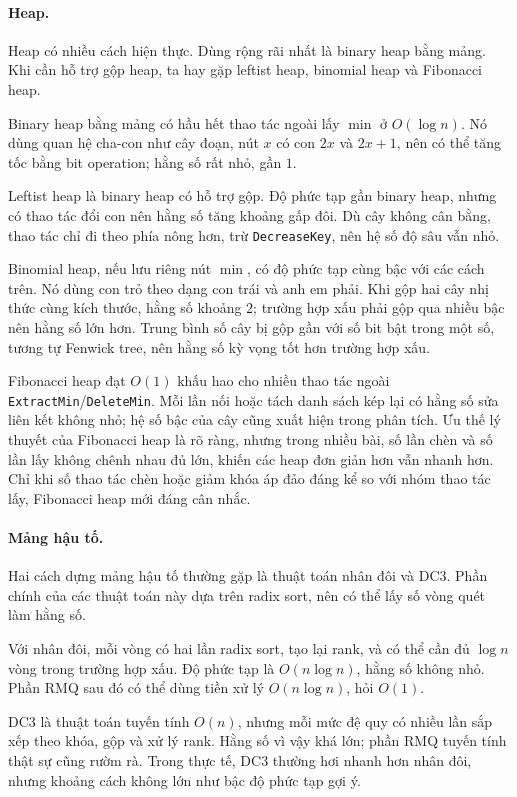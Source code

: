 \documentclass[11pt]{article}
\begin{document}
\paragraph{Heap.}
Heap có nhiều cách hiện thực. Dùng rộng rãi nhất là binary heap bằng mảng. Khi
cần hỗ trợ gộp heap, ta hay gặp leftist heap, binomial heap và Fibonacci heap.

Binary heap bằng mảng có hầu hết thao tác ngoài lấy \(\min\) ở \(O(\log n)\).
Nó dùng quan hệ cha-con như cây đoạn, nút \(x\) có con \(2x\) và \(2x+1\), nên
có thể tăng tốc bằng bit operation; hằng số rất nhỏ, gần \(1\).

Leftist heap là binary heap có hỗ trợ gộp. Độ phức tạp gần binary heap, nhưng
có thao tác đổi con nên hằng số tăng khoảng gấp đôi. Dù cây không cân bằng,
thao tác chỉ đi theo phía nông hơn, trừ \texttt{DecreaseKey}, nên hệ số độ sâu
vẫn nhỏ.

Binomial heap, nếu lưu riêng nút \(\min\), có độ phức tạp cùng bậc với các cách
trên. Nó dùng con trỏ theo dạng con trái và anh em phải. Khi gộp hai cây nhị
thức cùng kích thước, hằng số khoảng \(2\); trường hợp xấu phải gộp qua nhiều
bậc nên hằng số lớn hơn. Trung bình số cây bị gộp gần với số bit bật trong một
số, tương tự Fenwick tree, nên hằng số kỳ vọng tốt hơn trường hợp xấu.

Fibonacci heap đạt \(O(1)\) khấu hao cho nhiều thao tác ngoài
\texttt{ExtractMin}/\texttt{DeleteMin}. Mỗi lần nối hoặc tách danh sách kép lại
có hằng số sửa liên kết không nhỏ; hệ số bậc của cây cũng xuất hiện trong phân
tích. Ưu thế lý thuyết của Fibonacci heap là rõ ràng, nhưng trong nhiều bài,
số lần chèn và số lần lấy không chênh nhau đủ lớn, khiến các heap đơn giản hơn
vẫn nhanh hơn. Chỉ khi số thao tác chèn hoặc giảm khóa áp đảo đáng kể so với
nhóm thao tác lấy, Fibonacci heap mới đáng cân nhắc.

\paragraph{Mảng hậu tố.}
Hai cách dựng mảng hậu tố thường gặp là thuật toán nhân đôi và DC3. Phần chính
của các thuật toán này dựa trên radix sort, nên có thể lấy số vòng quét làm
hằng số.

Với nhân đôi, mỗi vòng có hai lần radix sort, tạo lại rank, và có thể cần đủ
\(\log n\) vòng trong trường hợp xấu. Độ phức tạp là \(O(n\log n)\), hằng số
không nhỏ. Phần RMQ sau đó có thể dùng tiền xử lý \(O(n\log n)\), hỏi \(O(1)\).

DC3 là thuật toán tuyến tính \(O(n)\), nhưng mỗi mức đệ quy có nhiều lần sắp xếp
theo khóa, gộp và xử lý rank. Hằng số vì vậy khá lớn; phần RMQ tuyến tính thật
sự cũng rườm rà. Trong thực tế, DC3 thường hơi nhanh hơn nhân đôi, nhưng khoảng
cách không lớn như bậc độ phức tạp gợi ý.
\end{document}
